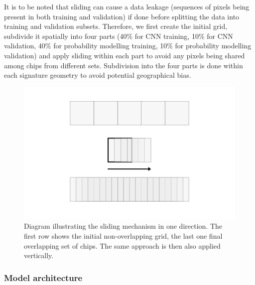 It is to be noted that sliding can cause a data leakage (sequences of pixels being
present in both training and validation) if done before splitting the data into
training and validation subsets. Therefore, we first create the initial grid, subdivide
it spatially into four parts (40\% for CNN training, 10\% for CNN validation, 40\% for
probability modelling training, 10\% for probability modelling validation) and apply
sliding within each part to avoid any pixels being shared among chips from different
sets. Subdivision into the four parts is done within each signature geometry to avoid
potential geographical bias.

\begin{figure}
    \centering
    \includegraphics[width=.8\linewidth]{fig/sliding.png}
    \caption{Diagram illustrating the sliding mechanism in one direction. The first row shows the initial non-overlapping grid, the last one final overlapping set of chips. The same approach is then also applied vertically.}
    \label{fig:sliding}
\end{figure}


\subsubsection{Model architecture}



